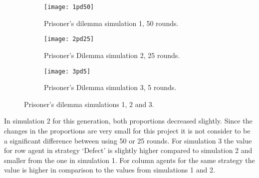 \begin{figure}[H]       
    \centering
    \begin{subfigure}[b]{0.3\textwidth}
	\centering
	{\texttt{[image: 1pd50]}}
	\caption{ Prisoner's dilemma simulation 1, 50 rounds.}
	\label{fig:pds1}
    \end{subfigure}
    \hfill
    \begin{subfigure}[b]{0.3\textwidth}
	\centering
	{\texttt{[image: 2pd25]}}
	\caption{ Prisoner's Dilemma simulation 2, 25 rounds.}
	\label{fig:pds2}
    \end{subfigure}
    \hfill
    \begin{subfigure}[b]{0.3\textwidth}
	\centering
	{\texttt{[image: 3pd5]}}
	\caption{Prisoner's Dilemma simulation 3, 5 rounds.}
	\label{fig:pds3}
    \end{subfigure}
    \caption{Prisoner's dilemma simulations 1, 2 and 3.}
    \label{pdsim345r5}
\end{figure}

In simulation 2 for this generation, both proportions decreased slightly. Since the changes in the proportions are very small for this project it is not consider to be a significant difference between using 50 or 25 rounds. For simulation 3 the value for row agent in strategy `Defect' is slightly higher compared to simulation 2  and smaller from the one in simulation 1. For column agents for the same strategy the value is higher in comparison to the values from simulations 1 and 2.
